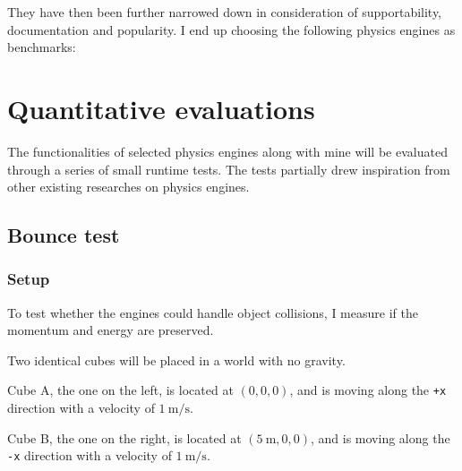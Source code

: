 \documentclass[12pt,a4paper,twoside,openright]{report}
\newcommand{\code}{\texttt}
\begin{document}
They have then been further narrowed down in consideration of supportability, documentation and popularity. I end up choosing the following physics engines as benchmarks:

\begin{table}[h]
  \centering
\end{table}


\section{Quantitative evaluations} \label{explbl}

The functionalities of selected physics engines along with mine will be evaluated through a series of small runtime tests.
The tests partially drew inspiration from other existing researches on physics engines\cite{seugling2006evaluation}.

\subsection{Bounce test}

\subsubsection{Setup}

To test whether the engines could handle object collisions, I measure if the momentum and energy are preserved.

Two identical cubes will be placed in a world with no gravity. 

Cube A, the one on the left, is located at $(0, 0, 0)$, and is moving along the \code{+x} direction with a velocity of $\SI{1}{\m\per\s}$.

Cube B, the one on the right, is located at $(\SI{5}{\m}, 0, 0)$, and is moving along the \code{-x} direction with a velocity of $\SI{1}{\m\per\s}$.
\end{document}
